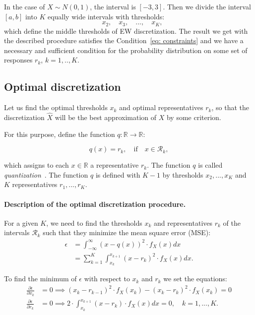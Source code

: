 \documentclass[10pt]{article}
\begin{document}
In the case of $X \sim N(0, 1)$, the interval is $[-3, 3]$. Then we divide the interval $[a, b]$ into $K$ equally wide intervals with thresholds:
$$
\quad x_{2}, \quad x_{3}, \quad ..., \quad x_{K},
$$
which define the middle thresholds of EW discretization. The result we get with the described procedure satisfies the Condition~\ref{eq: constraints} and we have a necessary and sufficient condition for the probability distribution on some set of responses $r_{k}$, $k = 1, .., K$.

\subsection{Optimal discretization}
Let us find the optimal thresholds $x_{k}$ and optimal representatives $r_{k}$, so that the discretization $\hat{X}$ will be the best approximation of $X$ by some criterion. 

For this purpose, define the function $q: \mathbb{R} \rightarrow \mathbb{R}$:

\begin{equation}
q(x) = r_{k}, \quad \text{if} \quad x \in \mathcal{R}_{k},
\end{equation}

which assigns to each $x \in \mathbb{R}$ a representative $r_{k}$. The function $q$ is called {\it quantization}~\cite{Gonzalez}. The function $q$ is defined with $K-1$ by thresholds $x_{2}, ..., x_{K}$ and $K$ representatives $r_{1}, ..., r_{K}$.

\paragraph{Description of the optimal discretization procedure.}
For a given $K$, we need to find the thresholds $x_{k}$ and representatives $r_{k}$ of the intervals $\mathcal{R}_{k}$ such that they minimize the mean square error (MSE):
\begin{align} \label{eq: eps}
\epsilon &= \int_{-\infty}^{\infty} \left( x - q(x) \right)^{2} \cdot f_{X}(x) dx \\
&= \sum_{k = 1}^{K} \int_{x_{k}}^{x_{k+1}} \left( x - r_{k} \right)^{2} \cdot f_{X}(x) dx.
\end{align}

To find the minimum of $\epsilon$ with respect to $x_{k}$ and $r_{k}$ we set the equations:
\begin{align}
\frac{\partial \epsilon}{\partial x_{k}} &= 0
\implies (x_{k} - r_{k-1})^{2} \cdot f_{X}(x_{k}) - 
(x_{k} - r_{k})^{2} \cdot f_{X}(x_{k}) = 0 \label{eq: part_xk} \\
\frac{\partial \epsilon}{\partial r_{k}} &= 0
\implies 2 \cdot \int_{x_{k}}^{x_{k+1}} (x - r_{k}) \cdot f_{X}(x)dx = 0, \quad k = 1,...,K. \label{eq: part_rk}
\end{align}
\end{document}
